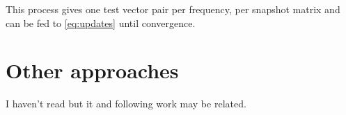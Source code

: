 \documentclass[onecolumn, twoside, 11pt]{article}
\begin{document}
This process gives one test vector pair per frequency, per snapshot matrix and can be fed to \eqref{eq:updates} until convergence.

\section{Other approaches}

I haven't read \cite{towne2015proceedings} but it and following work may be related.



\end{document}
